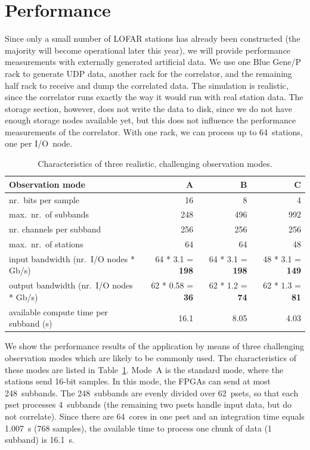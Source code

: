 \documentclass[10pt]{article}
\begin{document}
\section{Performance}

Since only a small number of LOFAR stations has already been constructed
(the majority will become operational later this year), we will provide 
performance measurements with externally generated artificial data.
We use one Blue Gene/P rack to generate UDP data, another rack for the
correlator, and the remaining half rack to receive and dump the correlated
data.
The simulation is realistic, since the correlator runs exactly
the way it would run with real station data.
The storage section, however, does not write the data to disk, since we do
not have enough storage nodes available yet, but this does not influence the
performance measurements of the correlator.
With one rack, we can process up to 64~stations, one per I/O~node.

\begin{table}[ht]
\begin{center}
\begin{tabular}{|l|rrr|}
\hline
Observation mode	 & \textsf{A}	& \textsf{B}	& \textsf{C}	\\
\hline
nr.\ bits per sample	 & 16		& 8		& 4	\\
max.\ nr.\ of subbands	 & 248		& 496		& 992	\\
nr. channels per subband & 256		& 256		& 256	\\
max.\ nr.\ of stations	 & 64		& 64		& 48	\\
\hline
input bandwidth (nr.\ I/O nodes * Gb/s)  & 64 * 3.1  = \bf{198} & 64 * 3.1 = \bf{198} & 48 * 3.1 = \bf{149} \\
output bandwidth (nr.\ I/O nodes * Gb/s) & 62 * 0.58 = \bf{36}  & 62 * 1.2 = \bf{74}  & 62 * 1.3 = \bf{81} \\
\hline
available compute time per subband (s)	 & 16.1	     & 8.05     & 4.03     \\
\hline
\end{tabular}
\end{center}
\caption{Characteristics of three realistic, challenging observation modes.}
\label{tab:observation-characteristics}
\end{table}

We show the performance results of the application by means of three
challenging observation modes which are likely to be commonly used.
The characteristics of these modes are listed in
Table~\ref{tab:observation-characteristics}.
Mode~\textsf{A} is the standard mode, where the stations send 16-bit samples.
In this mode, the FPGAs can send at most 248~subbands.
The 248~subbands are evenly divided over 62~psets, so that each pset processes
4~subbands (the remaining two psets handle input data, but do not correlate).
Since there are 64~cores in one pset and an integration time equals 1.007~s (768 samples),
the available time to process one chunk of data (1 subband) is 16.1~s.
\end{document}
